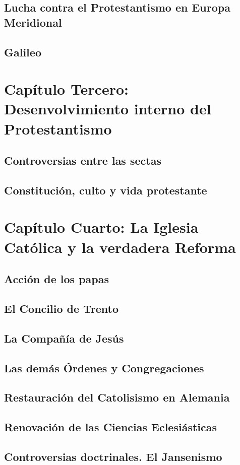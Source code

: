 \raggedbottom{} \documentclass[12pt, a4paper]{book}
\begin{document}
\section{Lucha contra el Protestantismo en Europa Meridional}
\section{Galileo}
\chapter{Capítulo Tercero: Desenvolvimiento interno del Protestantismo}
\section{Controversias entre las sectas}
\section{Constitución, culto y vida protestante}
\chapter{Capítulo Cuarto: La Iglesia Católica y la verdadera Reforma}
\section{Acción de los papas}
\section{El Concilio de Trento}
\section{La Compañía de Jesús}
\section{Las demás Órdenes y Congregaciones}
\section{Restauración del Catolisismo en Alemania}
\section{Renovación de las Ciencias Eclesiásticas}
\section{Controversias doctrinales. El Jansenismo}
\end{document}
